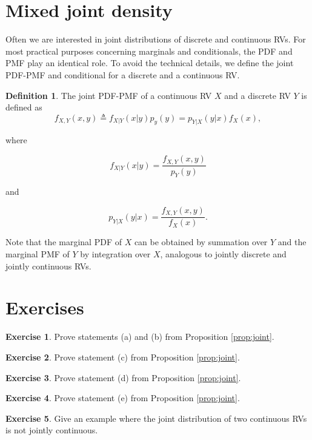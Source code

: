 \documentclass{book}
\theoremstyle{plain}%
\theoremstyle{definition}
\newtheorem{definition}{Definition}[section]
\newtheorem{exercise}{Exercise}[chapter]
\begin{document}
\section{Mixed joint density}

Often we are interested in joint distributions of discrete and continuous RVs. For most practical purposes concerning marginals and conditionals, the PDF and PMF play an identical role. To avoid the technical details, we define the joint PDF-PMF and conditional for a discrete and a continuous RV.

\begin{definition}
The joint PDF-PMF of a continuous RV $X$ and a discrete RV $Y$ is defined as
$$f_{X,Y}(x,y) \triangleq f_{X|Y}(x|y)p_y(y) = p_{Y|X}(y|x)f_X(x),$$

where

$$f_{X|Y}(x|y) = \frac{f_{X,Y}(x, y)}{p_Y(y)}$$

and

$$p_{Y|X}(y|x) = \frac{f_{X,Y}(x, y)}{f_X(x)}.$$

\end{definition}

Note that the marginal PDF of $X$ can be obtained by summation over $Y$ and the marginal PMF of $Y$ by integration over $X$, analogous to jointly discrete and jointly continuous RVs.
\section*{Exercises}

\begin{exercise}
Prove statements (a) and (b) from Proposition \ref{prop:joint}.
\end{exercise}

\begin{exercise}
Prove statement (c) from Proposition \ref{prop:joint}.
\end{exercise}

\begin{exercise}
Prove statement (d) from Proposition \ref{prop:joint}.
\end{exercise}

\begin{exercise}
Prove statement (e) from Proposition \ref{prop:joint}.
\end{exercise}

\begin{exercise}
Give an example where the joint distribution of two continuous RVs is not jointly continuous.
\end{exercise}
\end{document}
